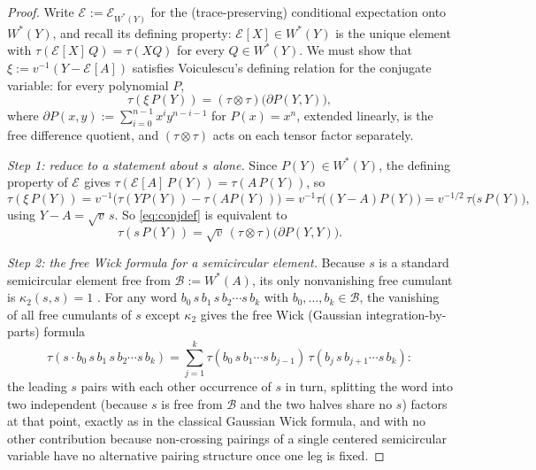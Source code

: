 \documentclass[11pt]{article}
\newcommand{\Econd}[1]{\mathcal{E}_{#1}}
\theoremstyle{plain}
\theoremstyle{definition}
\theoremstyle{remark}
\begin{document}
\begin{proof}
Write $\Econd{}:=\Econd{W^*(Y)}$ for the (trace-preserving) conditional expectation
onto $W^*(Y)$, and recall its defining property: $\Econd{}[X]\in W^*(Y)$ is the unique
element with $\tau(\Econd{}[X]\,Q)=\tau(XQ)$ for every $Q\in W^*(Y)$. We must show
that $\xi:=v^{-1}(Y-\Econd{}[A])$ satisfies Voiculescu's defining relation for the
conjugate variable: for every polynomial $P$,
\begin{equation}\label{eq:conjdef}
  \tau(\xi\,P(Y)) = (\tau\otimes\tau)\big(\partial P(Y,Y)\big),
\end{equation}
where $\partial P(x,y):=\sum_{i=0}^{n-1}x^iy^{n-i-1}$ for $P(x)=x^n$, extended
linearly, is the free difference quotient, and $(\tau\otimes\tau)$ acts on each tensor
factor separately.

\emph{Step 1: reduce to a statement about $s$ alone.} Since $P(Y)\in W^*(Y)$, the
defining property of $\Econd{}$ gives $\tau(\Econd{}[A]\,P(Y))=\tau(A\,P(Y))$, so
\[
  \tau(\xi\,P(Y)) = v^{-1}\big(\tau(Y P(Y)) - \tau(A P(Y))\big)
  = v^{-1}\tau\big((Y-A)P(Y)\big) = v^{-1/2}\,\tau\big(s\,P(Y)\big),
\]
using $Y-A=\sqrt v\,s$. So \eqref{eq:conjdef} is equivalent to
\begin{equation}\label{eq:reduced}
  \tau(s\,P(Y)) = \sqrt v\,(\tau\otimes\tau)\big(\partial P(Y,Y)\big).
\end{equation}

\emph{Step 2: the free Wick formula for a semicircular element.} Because $s$ is a
standard semicircular element free from $\mathcal B:=W^*(A)$, its only nonvanishing
free cumulant is $\kappa_2(s,s)=1$ \citep{VDN1992,NicaSpeicher2006}. For any word
$b_0\,s\,b_1\,s\,b_2\cdots s\,b_k$ with $b_0,\dots,b_k\in\mathcal B$, the vanishing of
all free cumulants of $s$ except $\kappa_2$ gives the free Wick (Gaussian
integration-by-parts) formula
\begin{equation}\label{eq:wick}
  \tau(s\cdot b_0\,s\,b_1\,s\,b_2\cdots s\,b_k)
  = \sum_{j=1}^{k}\tau(b_0\,s\,b_1\cdots s\,b_{j-1})\,\tau(b_j\,s\,b_{j+1}\cdots s\,b_k):
\end{equation}
the leading $s$ pairs with each other occurrence of $s$ in turn, splitting the word
into two independent (because $s$ is free from $\mathcal B$ and the two halves share
no $s$) factors at that point, exactly as in the classical Gaussian Wick formula, and
with no other contribution because non-crossing pairings of a single centered
semicircular variable have no alternative pairing structure once one leg is fixed.


\end{proof}
\end{document}
